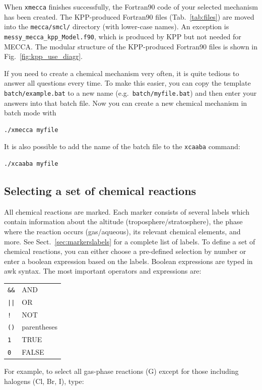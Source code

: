\documentclass[twoside]{article}
\begin{document}
When \verb|xmecca| finishes successfully, the Fortran90 code of your
selected mechanism has been created. The KPP-produced Fortran90 files
(Tab.~\ref{tab:files}) are moved into the \verb|mecca/smcl/| directory
(with lower-case names). An exception is
\verb|messy_mecca_kpp_Model.f90|, which is produced by KPP but not
needed for MECCA. The modular structure of the KPP-produced Fortran90
files is shown in Fig.~\ref{fig:kpp_use_diagr}.

If you need to create a chemical mechanism very often, it is quite
tedious to answer all questions every time. To make this easier, you can
copy the template \verb|batch/example.bat| to a new name (e.g.\
\verb|batch/myfile.bat|) and then enter your answers into that batch
file. Now you can create a new chemical mechanism in batch mode with
\begin{verbatim}
./xmecca myfile
\end{verbatim}
It is also possible to add the name of the batch file to the
\verb|xcaaba| command:
\begin{verbatim}
./xcaaba myfile
\end{verbatim}

\subsection{Selecting a set of chemical reactions}
\label{sec:selectreactions}

All chemical reactions are marked. Each marker consists of several
labels which contain information about the altitude
(troposphere/stratosphere), the phase where the reaction occurs
(gas/aqueous), its relevant chemical elements, and more. See
Sect.~\ref{sec:markerslabels} for a complete list of labels. To define a
set of chemical reactions, you can either choose a pre-defined selection
by number or enter a boolean expression based on the labels. Boolean
expressions are typed in awk syntax. The most important operators and
expressions are:\\
\begin{tabular}{l@{ = }l}
\verb|&&| & AND\\
\verb!||! & OR\\
\verb|!|  & NOT\\
\verb|()| & parentheses\\
\verb|1|  & TRUE\\
\verb|0|  & FALSE
\end{tabular}

For example, to select all gas-phase reactions (G) except for those
including halogens (Cl, Br, I), type:
\end{document}
